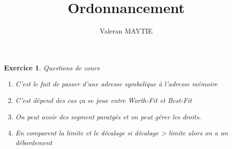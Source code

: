\documentclass{article}
\title{\textbf{Ordonnancement}}
\date{}
\author{Valeran MAYTIE}
\theoremstyle{plain}
\newtheorem{exo}{Exercice}%
\begin{document}
\maketitle

\begin{exo} Questions de cours
\begin{enumerate}
\item C'est le fait de passer d'une adresse symbolique à l'adresse mémoire

\item C'est dépend des cas ça se joue entre \textit{Worth-Fit} et \textit{Best-Fit}

\item On peut avoir des segment paratgés et on peut gérer les droits.

\item En comparent la limite et le décalage si décalage > limite alors on a un débordement
\end{enumerate}
\end{exo}
\end{document}
